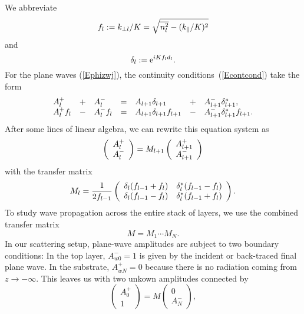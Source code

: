 We abbreviate
\begin{equation}
  f_l := k_{\perp l}/K = \sqrt{\overline{n_l^2}-(k_\parallel/K)^2}
\end{equation}
and
\begin{equation}
   \delta_l := \text{e}^{iKf_l d_l}.
\end{equation}
For the plane waves (\ref{Ephizwj}),
the continuity conditions~(\ref{Econtcond}) take the form
\begin{equation}\label{Econt2}
  \begin{array}{lclclcl}
  A^+_l &+& A^-_l
  &=&
  A_{l+1}\delta_{l+1} &+& A^-_{l+1}\delta_{l+1}^*,
  \\
  A^+_l f_l  &-& A^-_l f_l
  &=&
  A_{l+1}\delta_{l+1} f_{l+1} &-& A^-_{l+1}\delta_{l+1}^* f_{l+1}.
  \end{array}
\end{equation}
After some lines of linear algebra,
we can rewrite this equation system as
\begin{equation}\label{EcMc}
  \left( \begin{array}{c}A^+_l\\A^-_l\end{array} \right)
  = M_{l+1} \left( \begin{array}{c}A^+_{l+1}\\A^-_{l+1}\end{array} \right)
\end{equation}
with the transfer matrix
\begin{equation}
  M_l
   = \frac{1}{2f_{l-1}}
   \left(\begin{array}{cc}
       \delta_l(f_{l-1}+f_l)&\delta_l^*(f_{l-1}-f_l)\\
       \delta_l(f_{l-1}-f_l)&\delta_l^*(f_{l-1}+f_l)
   \end{array}\right).
\end{equation}
To study wave propagation across the entire stack of layers,
we use the combined transfer matrix
\begin{equation}
   M = M_1 \cdots M_N.
\end{equation}
In our scattering setup,
plane-wave amplitudes are subject to two boundary conditions:
In the top layer, $A^-_{w0}=1$ is given by the
incident or back-traced final plane wave.
In the substrate, $A^+_{wN}=0$ because there is no radiation
coming from $z\to-\infty$.
This leaves us with two unkown amplitudes connected by
\begin{equation}
  \left( \begin{array}{c}A^+_0\\1\end{array} \right)
  = M \left( \begin{array}{c}0\\A^-_N\end{array} \right),
\end{equation}
